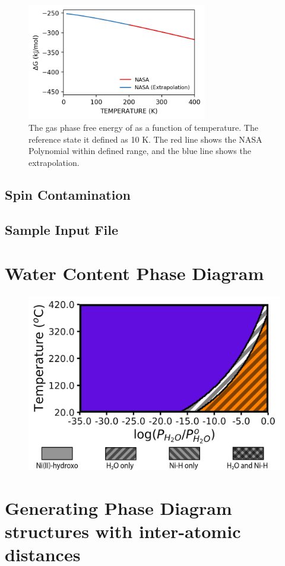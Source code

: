 \documentclass[12pt]{article}
\begin{document}
\begin{figure}[H]
    \centering
    \includegraphics[width=0.70\textwidth]{zi-images/00-General-Graphics/2021-figure-H2O-pMuTT.png}
    \caption{The gas phase free energy of  as a function of temperature. The reference state it defined as 10 K. The red line shows the NASA Polynomial within defined range, and the blue line shows the extrapolation.}    \label{fig:h2o-pmutt-expression}
\end{figure}




\subsection{Spin Contamination}

\subsection{Sample Input File}


\section{Water Content Phase Diagram}
\begin{figure}[H]
   \centering
    \includegraphics{zi-images/00-General-Graphics/2021-figure-H2O-phase-diagram-manuscript.png}
   \caption{}
   \label{fig:phase-diagram-h2o}
\end{figure}

\section{Generating Phase Diagram structures with inter-atomic distances}
\end{document}
